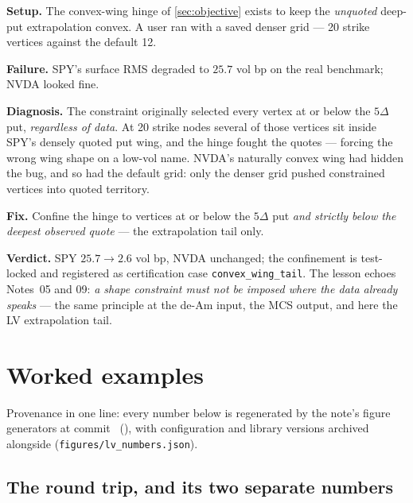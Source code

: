 \documentclass[11pt]{article}
\begin{document}
\begin{example}[title={Case file: the convex wing that flattened SPY}]
\textbf{Setup.}  The convex-wing hinge of \cref{sec:objective} exists to
keep the \emph{unquoted} deep-put extrapolation convex.  A user ran with a
saved denser grid --- 20 strike vertices against the default 12.

\textbf{Failure.}  SPY's surface RMS degraded to $25.7$ vol bp on the real
benchmark; NVDA looked fine.

\textbf{Diagnosis.}  The constraint originally selected every vertex at or
below the $5\Delta$ put, \emph{regardless of data}.  At 20 strike nodes
several of those vertices sit inside SPY's densely quoted put wing, and the
hinge fought the quotes --- forcing the wrong wing shape on a low-vol name.
NVDA's naturally convex wing had hidden the bug, and so had the default
grid: only the denser grid pushed constrained vertices into quoted
territory.

\textbf{Fix.}  Confine the hinge to vertices at or below the $5\Delta$ put
\emph{and strictly below the deepest observed quote} --- the extrapolation
tail only.

\textbf{Verdict.}  SPY $25.7\to2.6$ vol bp, NVDA unchanged; the confinement
is test-locked and registered as certification case
\texttt{convex\_wing\_tail}.  The lesson echoes Notes~05 and 09: \emph{a
shape constraint must not be imposed where the data already speaks} --- the
same principle at the de-Am input, the MCS output, and here the LV
extrapolation tail.
\end{example}

\section{Worked examples}
\label{sec:examples}

Provenance in one line: every number below is regenerated by the note's
figure generators at commit \texttt{\lvgencommit}\ (\lvgendate), with
configuration and library versions archived alongside
(\nolinkurl{figures/lv_numbers.json}).

\subsection{The round trip, and its two separate numbers}
\end{document}
